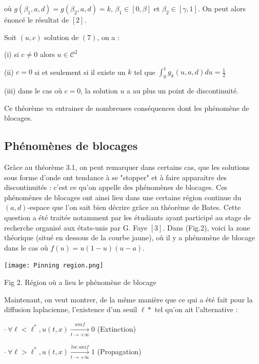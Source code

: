 \documentclass{article}
\begin{document}
\noindent où $g(\beta_1,a,d) = g(\beta_2,a,d) = k$, $\beta_1 \in [0,\beta]$ et $\beta_2 \in [\gamma,1]$. On peut alors énoncé le résultat de $[2]$.

\begin{Theoreme}[Bates 97]
	Soit $(u,c)$ solution de $(7)$, on a  : 

	(i) si $c \neq 0 $ alors $u \in \mathcal{C}^2$

	(ii) $c=0$ si et seulement si il existe un $k$ tel que $\int_0^1 g_k(u,a,d)du = \frac{1}{2}$

	(iii)  dans le cas où $c=0$, la solution $u$ a au plus un point de discontinuité. 
\end{Theoreme}

Ce théorème va entrainer de nombreuses conséquences dont les phénomène de blocages.

\subsection{Phénomènes de blocages}

Grâce au théorème 3.1, on peut remarquer dans certains cas, que les solutions sous forme d'onde ont tendance à se "stopper" et à faire apparaitre des discontinuités : c'est ce qu'on appelle des phénomènes de blocages. Ces phénomènes de blocages ont ainsi lieu dans une certaine région continue du $(a,d)$-espace que l'on sait bien décrire grâce au théorème de Bates. Cette question a été traitée notamment par les étudiants ayant participé au stage de recherche organisé aux états-unis par G. Faye $[3]$. Dans (Fig.2), voici la zone théorique (situé en dessous de la courbe jaune), où il y a phénomène de blocage dans le cas où $f(u) = u(1-u)(u-a)$.

\begin{center}
\texttt{[image: Pinning region.png]}

Fig 2. Région où a lieu le phénomène de blocage
\end{center}



Maintenant, on veut montrer, de la même manière que ce qui a été fait pour la diffusion laplacienne, l'existence d'un seuil $\ell *$ tel qu'on ait l'alternative :

$\cdot~ \forall \ell < \ell^* , u(t,x) \underset{t \to +\infty}{\overset{unif}{\longrightarrow}}0$ (Extinction)

$\cdot ~\forall \ell > \ell^* , u(t,x) \underset{t \to +\infty}{\overset{loc. unif}{\longrightarrow}}1$ (Propagation)
\end{document}
